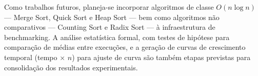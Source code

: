\documentclass[12pt]{article}
\begin{document}
Como trabalhos futuros, planeja-se incorporar algoritmos de
classe $O(n \log n)$ — Merge Sort, Quick Sort e Heap Sort —
bem como algoritmos não comparativos — Counting Sort e
Radix Sort — à infraestrutura de benchmarking. A análise
estatística formal, com testes de hipótese para comparação
de médias entre execuções, e a geração de curvas de
crescimento temporal (tempo $\times$ $n$) para ajuste de
curva são também etapas previstas para consolidação dos
resultados experimentais.




%
%
%
%
%
\end{document}

